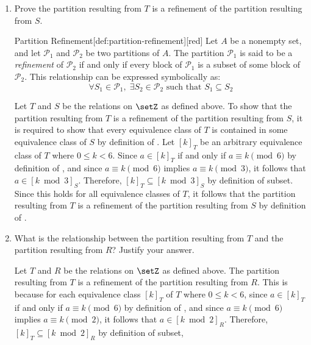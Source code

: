 \begin{enumerate}
\begin{enumerate}
    \item Prove the partition resulting from $T$ is a refinement of the partition resulting from $S$.
\begin{define}{Partition Refinement}[def:partition-refinement][red]
  Let $A$ be a nonempty set, and let $\mathcal{P}_1$ and $\mathcal{P}_2$ be 
  two partitions of $A$. The partition $\mathcal{P}_1$ is said to be a 
  \emph{refinement} of $\mathcal{P}_2$ if and only if every block of 
  $\mathcal{P}_1$ is a subset of some block of $\mathcal{P}_2$. 
  This relationship can be expressed symbolically as:
  $$ \forall S_1 \in \mathcal{P}_1, \; \exists S_2 \in \mathcal{P}_2 \text{ such that } S_1 \subseteq S_2 $$
\end{define}
      \begin{subprove}
        Let $T$ and $S$ be the relations on $\setZ$ as defined above. 
        To show that the partition resulting from $T$ is a refinement of the partition resulting from $S$, 
        it is required to show that every equivalence class of $T$ is contained in some equivalence class of $S$ by definition of .
        Let $[k]_T$ be an arbitrary equivalence class of $T$ where $0 \leq k < 6$. 
        Since $a \in [k]_T$ if and only if $a \equiv k \pmod{6}$ by definition of , 
        and since $a \equiv k \pmod{6}$ implies $a \equiv k \pmod{3}$, 
        it follows that $a \in [k \bmod 3]_S$. 
        Therefore, $[k]_T \subseteq [k \bmod 3]_S$ by definition of subset. 
        Since this holds for all equivalence classes of $T$, it follows that the partition resulting from $T$ is a refinement of the partition resulting from $S$ by definition of .
      \end{subprove}
    \item What is the relationship between the partition resulting from $T$ and the partition resulting from $R$? Justify your answer.
      \begin{subanswer}
        Let $T$ and $R$ be the relations on $\setZ$ as defined above. 
        The partition resulting from $T$ is a refinement of the partition resulting from $R$. 
        This is because for each equivalence class $[k]_T$ of $T$ where $0 \leq k < 6$, 
        since $a \in [k]_T$ if and only if $a \equiv k \pmod{6}$ by definition of , 
        and since $a \equiv k \pmod{6}$ implies $a \equiv k \pmod{2}$, 
        it follows that $a \in [k \bmod 2]_R$. 
        Therefore, $[k]_T \subseteq [k \bmod 2]_R$ by definition of subset, 

\end{subanswer}
\end{enumerate}
\end{enumerate}
